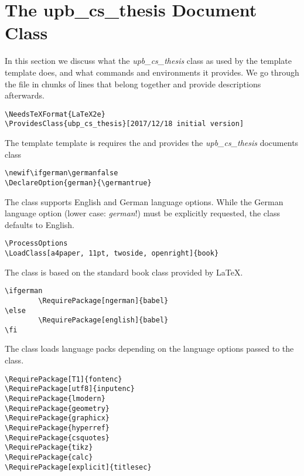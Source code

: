 \chapter{The upb\_cs\_thesis Document Class}
\label{ch:class_file}

In this section we discuss what the \emph{upb\_cs\_thesis} class as used by the
\acs{template} template does, and what commands and environments it provides.
We go through the file in chunks of lines that belong together and provide
descriptions afterwards.



\begin{verbatim}
\NeedsTeXFormat{LaTeX2e}
\ProvidesClass{ubp_cs_thesis}[2017/12/18 initial version]
\end{verbatim}

\vspace*{-6pt} \noindent
The \acs{template} template is requires the \LaTeXe{} and provides the
\emph{upb\_cs\_thesis} documents class



\begin{verbatim}
\newif\ifgerman\germanfalse
\DeclareOption{german}{\germantrue}
\end{verbatim}

\vspace*{-6pt} \noindent
The class supports English and German language options.
While the German language option (lower case: \emph{german}!) must be
explicitly requested, the class defaults to English.



\begin{verbatim}
\ProcessOptions
\LoadClass[a4paper, 11pt, twoside, openright]{book}
\end{verbatim}

\vspace*{-6pt} \noindent
The class is based on the standard book class provided by \LaTeX{}.



\begin{verbatim}
\ifgerman
        \RequirePackage[ngerman]{babel}
\else
        \RequirePackage[english]{babel}
\fi
\end{verbatim}

\vspace*{-6pt} \noindent
The class loads language packs depending on the language options passed to the
class.


\begin{verbatim}
\RequirePackage[T1]{fontenc}
\RequirePackage[utf8]{inputenc}
\RequirePackage{lmodern}
\RequirePackage{geometry}
\RequirePackage{graphicx}
\RequirePackage{hyperref}
\RequirePackage{csquotes}
\RequirePackage{tikz}
\RequirePackage{calc}
\RequirePackage[explicit]{titlesec}
\end{verbatim}

